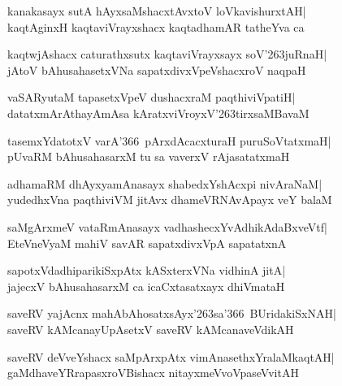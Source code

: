 \documentclass[twoside,12pt,openright]{book}
\def\S{\char'263}
\newcounter{shloka}[chapter]
\begin{document}
\begin{shloka}%
kanakasayx sutA hAyxsaMshacxtAvxtoV loVkavishurxtAH|\\
kaqtAginxH kaqtaviVrayxshacx kaqtadhamAR tatheYva ca 
\end{shloka}

\begin{shloka}%
kaqtwjAshacx caturathxsutx kaqtaviVrayxsayx soV\S juRnaH|\\
jAtoV bAhusahasetxVNa sapatxdivxVpeVshacxroV naqpaH
\end{shloka}

\begin{shloka}%
vaSARyutaM tapasetxVpeV dushacxraM paqthiviVpatiH|\\
datatxmArAthayAmAsa kAratxviVroyxV\S tirxsaMBavaM
\end{shloka}

\begin{shloka}%
tasemxYdatotxV varA\char'366\ pArxdAcacxturaH puruSoVtatxmaH|\\
pUvaRM bAhusahasarxM tu sa vaverxV rAjasatatxmaH
\end{shloka}

\begin{shloka}%
adhamaRM dhAyxyamAnasayx shabedxYshAcxpi nivAraNaM|\\
yudedhxVna paqthiviVM jitAvx dhameVRNAvApayx veY balaM
\end{shloka}

\begin{shloka}%
saMgArxmeV vataRmAnasayx vadhashecxYvAdhikAdaBxveVtf|\\
EteVneVyaM mahiV savAR sapatxdivxVpA sapatatxnA
\end{shloka}

\begin{shloka}%
sapotxVdadhiparikiSxpAtx kASxterxVNa vidhinA jitA|\\
jajecxV bAhusahasarxM ca icaCxtasatxayx dhiVmataH
\end{shloka}

\begin{shloka}%
saveRV yajAcnx mahAbAhosatxsAyx\S sa\char'366\ BUridakiSxNAH|\\
saveRV kAMcanayUpAsetxV saveRV kAMcanaveVdikAH
\end{shloka}

\begin{shloka}%
saveRV deVveYshacx saMpArxpAtx vimAnasethxYralaMkaqtAH|\\
gaMdhaveYRrapasxroVBishacx nitayxmeVvoVpaseVvitAH
\end{shloka}
\end{document}
